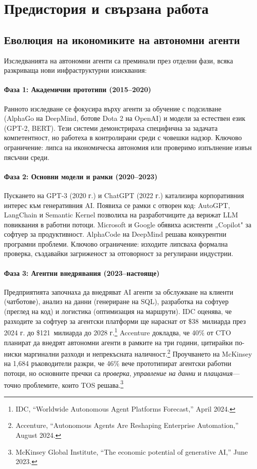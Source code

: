 \documentclass[11pt]{article}
\begin{document}
\section{Предистория и свързана работа}
\subsection{Еволюция на икономиките на автономни агенти}
Изследванията на автономни агенти са преминали през отделни фази, всяка разкриваща нови инфраструктурни изисквания:

\paragraph{Фаза 1: Академични прототипи (2015--2020)} Ранното изследване се фокусира върху агенти за обучение с подсилване (AlphaGo на DeepMind, ботове Dota 2 на OpenAI) и модели за естествен език (GPT-2, BERT). Тези системи демонстрираха специфична за задачата компетентност, но работеха в контролирани среди с човешки надзор. Ключово ограничение: липса на икономическа автономия или проверимо изпълнение извън пясъчни среди.

\paragraph{Фаза 2: Основни модели и рамки (2020--2023)} Пускането на GPT-3 (2020 г.) и ChatGPT (2022 г.) катализира корпоративния интерес към генеративния AI. Появиха се рамки с отворен код: AutoGPT, LangChain и Semantic Kernel позволиха на разработчиците да верижат LLM повиквания в работни потоци. Microsoft и Google обявиха асистенти „Copilot" за софтуер за продуктивност. AlphaCode на DeepMind решава конкурентни програмни проблеми. Ключово ограничение: изходите липсваха формална проверка, създавайки загриженост за отговорност за регулирани индустрии.

\paragraph{Фаза 3: Агентни внедрявания (2023--настояще)} Предприятията започнаха да внедряват AI агенти за обслужване на клиенти (чатботове), анализ на данни (генериране на SQL), разработка на софтуер (преглед на код) и логистика (оптимизация на маршрути). IDC оценява, че разходите за софтуер за агентски платформи ще нараснат от \$38~милиарда през 2024 г. до \$121~милиарда до 2028 г.\footnote{IDC, ``Worldwide Autonomous Agent Platforms Forecast,'' April 2024.} Accenture докладва, че 40\% от CTO планират да внедрят автономни агенти в рамките на три години, цитирайки по-ниски маргинални разходи и непрекъсната наличност.\footnote{Accenture, ``Autonomous Agents Are Reshaping Enterprise Automation,'' August 2024.} Проучването на McKinsey на 1,684 ръководители разкри, че 46\% вече прототипират агентски работни потоци, но основните пречки са \emph{проверка}, \emph{управление на данни} и \emph{плащания}---точно проблемите, които TOS решава.\footnote{McKinsey Global Institute, ``The economic potential of generative AI,'' June 2023.}
\end{document}

